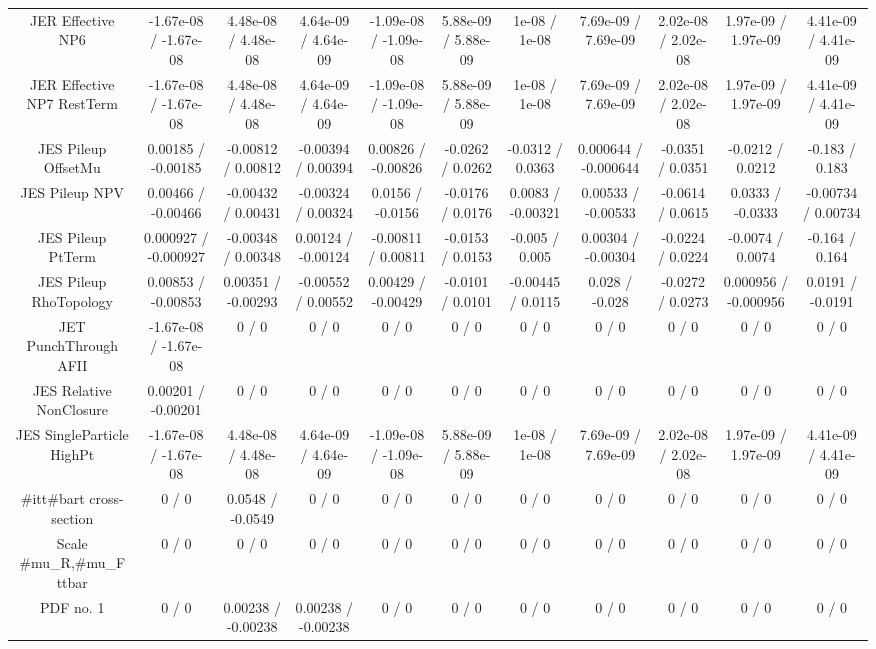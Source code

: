\begin{table}[htbp]
\begin{center}
\begin{tabular}{|c|c|c|c|c|c|c|c|c|c|c|}
  JER Effective NP6 & -1.67e-08 / -1.67e-08 & 4.48e-08 / 4.48e-08 & 4.64e-09 / 4.64e-09 & -1.09e-08 / -1.09e-08 & 5.88e-09 / 5.88e-09 & 1e-08 / 1e-08 & 7.69e-09 / 7.69e-09 & 2.02e-08 / 2.02e-08 & 1.97e-09 / 1.97e-09 & 4.41e-09 / 4.41e-09 \\ 
  JER Effective NP7 RestTerm & -1.67e-08 / -1.67e-08 & 4.48e-08 / 4.48e-08 & 4.64e-09 / 4.64e-09 & -1.09e-08 / -1.09e-08 & 5.88e-09 / 5.88e-09 & 1e-08 / 1e-08 & 7.69e-09 / 7.69e-09 & 2.02e-08 / 2.02e-08 & 1.97e-09 / 1.97e-09 & 4.41e-09 / 4.41e-09 \\ 
  JES Pileup OffsetMu & 0.00185 / -0.00185 & -0.00812 / 0.00812 & -0.00394 / 0.00394 & 0.00826 / -0.00826 & -0.0262 / 0.0262 & -0.0312 / 0.0363 & 0.000644 / -0.000644 & -0.0351 / 0.0351 & -0.0212 / 0.0212 & -0.183 / 0.183 \\ 
  JES Pileup NPV & 0.00466 / -0.00466 & -0.00432 / 0.00431 & -0.00324 / 0.00324 & 0.0156 / -0.0156 & -0.0176 / 0.0176 & 0.0083 / -0.00321 & 0.00533 / -0.00533 & -0.0614 / 0.0615 & 0.0333 / -0.0333 & -0.00734 / 0.00734 \\ 
  JES Pileup PtTerm & 0.000927 / -0.000927 & -0.00348 / 0.00348 & 0.00124 / -0.00124 & -0.00811 / 0.00811 & -0.0153 / 0.0153 & -0.005 / 0.005 & 0.00304 / -0.00304 & -0.0224 / 0.0224 & -0.0074 / 0.0074 & -0.164 / 0.164 \\ 
  JES Pileup RhoTopology & 0.00853 / -0.00853 & 0.00351 / -0.00293 & -0.00552 / 0.00552 & 0.00429 / -0.00429 & -0.0101 / 0.0101 & -0.00445 / 0.0115 & 0.028 / -0.028 & -0.0272 / 0.0273 & 0.000956 / -0.000956 & 0.0191 / -0.0191 \\ 
  JET PunchThrough AFII & -1.67e-08 / -1.67e-08 & 0 / 0 & 0 / 0 & 0 / 0 & 0 / 0 & 0 / 0 & 0 / 0 & 0 / 0 & 0 / 0 & 0 / 0 \\ 
  JES Relative NonClosure & 0.00201 / -0.00201 & 0 / 0 & 0 / 0 & 0 / 0 & 0 / 0 & 0 / 0 & 0 / 0 & 0 / 0 & 0 / 0 & 0 / 0 \\ 
  JES SingleParticle HighPt & -1.67e-08 / -1.67e-08 & 4.48e-08 / 4.48e-08 & 4.64e-09 / 4.64e-09 & -1.09e-08 / -1.09e-08 & 5.88e-09 / 5.88e-09 & 1e-08 / 1e-08 & 7.69e-09 / 7.69e-09 & 2.02e-08 / 2.02e-08 & 1.97e-09 / 1.97e-09 & 4.41e-09 / 4.41e-09 \\ 
  #it{t#bar{t}} cross-section & 0 / 0 & 0.0548 / -0.0549 & 0 / 0 & 0 / 0 & 0 / 0 & 0 / 0 & 0 / 0 & 0 / 0 & 0 / 0 & 0 / 0 \\ 
  Scale #mu_{R},#mu_{F} ttbar & 0 / 0 & 0 / 0 & 0 / 0 & 0 / 0 & 0 / 0 & 0 / 0 & 0 / 0 & 0 / 0 & 0 / 0 & 0 / 0 \\ 
  PDF no. 1 & 0 / 0 & 0.00238 / -0.00238 & 0.00238 / -0.00238 & 0 / 0 & 0 / 0 & 0 / 0 & 0 / 0 & 0 / 0 & 0 / 0 & 0 / 0 \\ 

\end{tabular}
\end{center}
\end{table}
